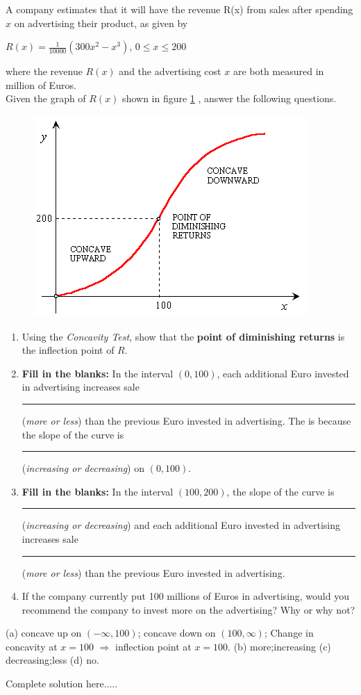 \begin{example}
A company estimates that it will have the revenue R(x) from sales after spending $x$ on advertising their product, as given by
\begin{center}
    $R(x)=\displaystyle\frac{1}{10000}(300x^2-x^3)$,\hspace{10pt} $0\le x\le 200$
\end{center}
where the revenue $R(x)$ and the advertising cost $x$ are both measured in million of Euros.\\
Given the graph of $R(x)$ shown in figure \ref{fig:diminishR1} , answer the following questions.
\begin{figure}[h]
    \centering
    \caption{} 
    \includegraphics[scale=0.5]{images/2ndDervConcavity/diminishR1.png} 
    \label{fig:diminishR1}
\end{figure}
\renewcommand{\labelenumi}{(\alph{enumi})}
\begin{enumerate}[leftmargin=*]
    \item Using the \emph{Concavity Test}, show that the \textbf{point of diminishing returns} is the inflection point of $R$.
   \newpage
    \item \textbf{Fill in the blanks:} In the interval $(0,100)$, each additional Euro invested in advertising increases sale \rule{2cm}{0.25mm} (\emph{more or less}) than the previous Euro invested in advertising. The is because the slope of the curve is \rule{2cm}{0.25mm} (\emph{increasing or decreasing}) on $(0,100)$.\vfill
    \item \textbf{Fill in the blanks:} In the interval $(100,200)$, the slope of the curve is \rule{2cm}{0.25mm} (\emph{increasing or decreasing}) and each additional Euro invested in advertising increases sale \rule{2cm}{0.25mm} (\emph{more or less}) than the previous Euro invested in advertising.\vfill
    \item If the company currently put 100 millions of Euros in advertising, would you recommend the company to invest more on the advertising? Why or why not?\vfill
\end{enumerate}
    \begin{sol}
    (a) concave up on $(-\infty,100)$; concave down on $(100,\infty)$; Change in concavity at $x=100$ $\Longrightarrow$ inflection point at $x=100$. (b) more;increasing (c) decreasing;less (d) no.
    \end{sol}
    \begin{solL}
    Complete solution here.....
    

\end{solL}
\end{example}
